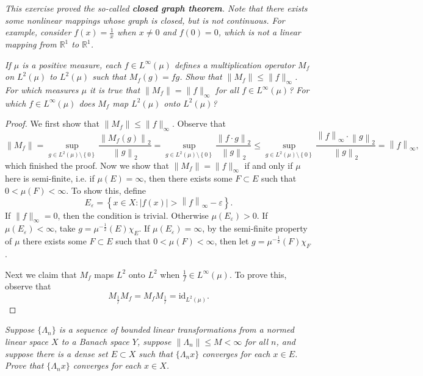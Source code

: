 \begin{note}\em
This exercise proved the so-called \textbf{closed graph theorem}. Note that there exists some nonlinear mappings whose graph is closed, but is not continuous. For example, consider $f(x)=\frac{1}{x}$ when $x\ne 0$ and $f(0)=0$, which is not a linear mapping from $\mathbb{R}^1$ to $\mathbb{R}^1$.
\end{note}
\begin{problem}\em
If $\mu$ is a positive measure, each $f\in L^\infty(\mu)$ defines a multiplication operator $M_f$ on $L^2(\mu)$ to $L^2(\mu)$ such that $M_f(g)=fg$. Show that $\|M_f\|\le\|f\|_\infty$. For which measures $\mu$ it is true that $\|M_f\|=\|f\|_\infty$ for all $f\in L^\infty(\mu)$? For which $f\in L^\infty(\mu)$ does $M_f$ map $L^2(\mu)$ onto $L^2(\mu)$?
\end{problem}
\begin{proof}
We first show that $\|M_f\|\le\|f\|_\infty$. Observe that 
$$
\left\| M_f \right\| =\mathop {\mathrm{sup}} \limits_{g\in L^2\left( \mu \right) \setminus \left\{ 0 \right\}}\frac{\left\| M_f\left( g \right) \right\| _2}{\left\| g \right\| _2}=\mathop {\mathrm{sup}} \limits_{g\in L^2\left( \mu \right) \setminus \left\{ 0 \right\}}\frac{\left\| f\cdot g \right\| _2}{\left\| g \right\| _2}\le \mathop {\mathrm{sup}} \limits_{g\in L^2\left( \mu \right) \setminus \left\{ 0 \right\}}\frac{\left\| f \right\| _{\infty}\cdot \left\| g \right\| _2}{\left\| g \right\| _2}=\left\| f \right\| _{\infty},
$$
which finished the proof. Now we show that $\|M_f\|=\|f\|_\infty$ if and only if $\mu$ here is semi-finite, i.e. if $\mu(E)=\infty$, then there exists some $F\subset E$ such that $0<\mu(F)<\infty$. To show this, define 
$$
E_{\varepsilon}=\left\{ x\in X:\left| f\left( x \right) \right|>\left\| f \right\| _{\infty}-\varepsilon \right\} .
$$
If $\|f\|_\infty=0$, then the condition is trivial. Otherwise $\mu(E_\varepsilon)>0$. If $\mu(E_\varepsilon)<\infty$, take $g=\mu^{-\frac{1}{2}}(E)\chi_E$. If $\mu(E_\varepsilon)=\infty$, by the semi-finite property of $\mu$ there exists some $F\subset E$ such that $0<\mu(F)<\infty$, then let $g=\mu^{-\frac{1}{2}}(F)\chi_F$.\par
Next we claim that $M_f$ maps $L^2$ onto $L^2$ when $\frac{1}{f}\in L^\infty(\mu)$. To prove this, observe that 
$$
M_{\frac{1}{f}}M_f=M_fM_{\frac{1}{f}}=\mathrm{id}_{L^2\left( \mu \right)}.
$$
\end{proof}
\begin{problem}\em
Suppose $\{\Lambda_n\}$ is a sequence of bounded linear transformations from a normed linear space $X$ to a Banach space $Y$, suppose $\|\Lambda_n\|\le M<\infty$ for all $n$, and suppose there is a dense set $E\subset X$ such that $\{\Lambda_nx\}$ converges for each $x\in E$. Prove that $\{\Lambda_nx\}$ converges for each $x\in X$.
\end{problem}

